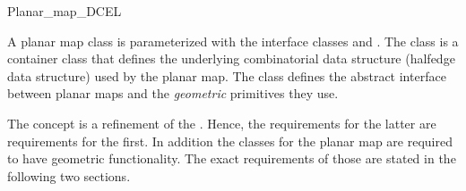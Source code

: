 
\ccRefPageBegin


\begin{ccRefConcept}{Planar_map_DCEL}

A planar map class is parameterized with the interface classes 
 and  . The  class is
a container class that defines the 
underlying combinatorial data structure (halfedge data structure) 
used by the planar map. 
The  class defines the abstract interface
between planar maps and the {\em geometric} primitives they use. 

The
\lcTex{\ccc{\ccRefName}}\lcHtml{\ccRefName}
concept is a refinement of the . Hence, the requirements for the latter are requirements for the first. 
In addition 
the 
classes for the planar map are
required to have geometric functionality. 
The exact requirements of those are stated in the following two sections.
\end{ccRefConcept} %

\ccRefPageEnd

